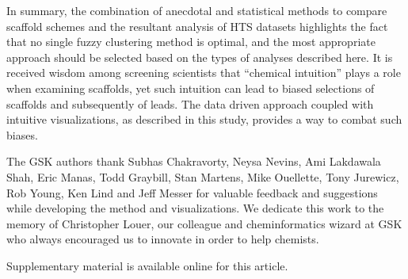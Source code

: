 \documentclass[journal=jacsat,manuscript=article]{achemso}
\begin{document}
In summary, the combination of anecdotal and statistical methods to
compare scaffold schemes and the resultant analysis of HTS datasets
highlights the fact that no single fuzzy clustering method is optimal,
and the most appropriate approach should be selected based on the
types of analyses described here. It is received wisdom among screening scientists 
that ``chemical intuition'' plays a role when examining scaffolds, yet such intuition
can lead to biased selections of scaffolds and subsequently of
leads. The data driven approach coupled with intuitive visualizations,
as described in this study, provides a way to combat such biases.


\begin{acknowledgement}
  The GSK authors thank Subhas Chakravorty, Neysa Nevins, Ami Lakdawala Shah,
  Eric Manas, Todd Graybill, Stan Martens, Mike Ouellette, Tony Jurewicz, Rob
  Young, Ken Lind and Jeff Messer for valuable feedback and suggestions while developing the method and visualizations. We dedicate this work to the memory of Christopher Louer, our colleague and cheminformatics wizard at GSK who always encouraged us to innovate in order to help chemists.  
\end{acknowledgement}

\begin{suppinfo}
Supplementary material is available online for this article.
\end{suppinfo}


\end{document}
